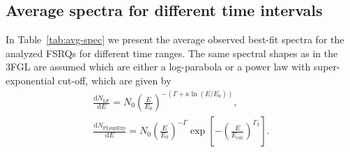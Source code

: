 \documentclass[twocolumn,linenumbers]{aastex62}
\begin{document}
\begin{appendix}

\section{Average spectra for different time intervals}
\label{sec:avg-spec}
In Table~\ref{tab:avg-spec} we present the average observed best-fit spectra for the analyzed FSRQs for different time ranges. 
The same spectral shapes as in the 3FGL are assumed which are either a log-parabola or a power law with super-exponential cut-off, which are given by
\begin{eqnarray}
    \frac{\mathrm{d}N_\mathrm{LP}}{\mathrm{d}E} = N_0 \left(\frac{E}{E_0}\right)^{-(\Gamma + \kappa\ln(E / E_0))}, \label{eq:avg-spec-lp}\\
    \frac{\mathrm{d}N_\mathrm{PLsupExp}}{\mathrm{d}E} = N_0 \left(\frac{E}{E_0}\right)^{-\Gamma}\exp\left[-\left(\frac{E}{E_\mathrm{cut}} \right)^{\Gamma_2}\right]\label{eq:avg-spec-plexp}.
\end{eqnarray}


\end{appendix}
\end{document}
